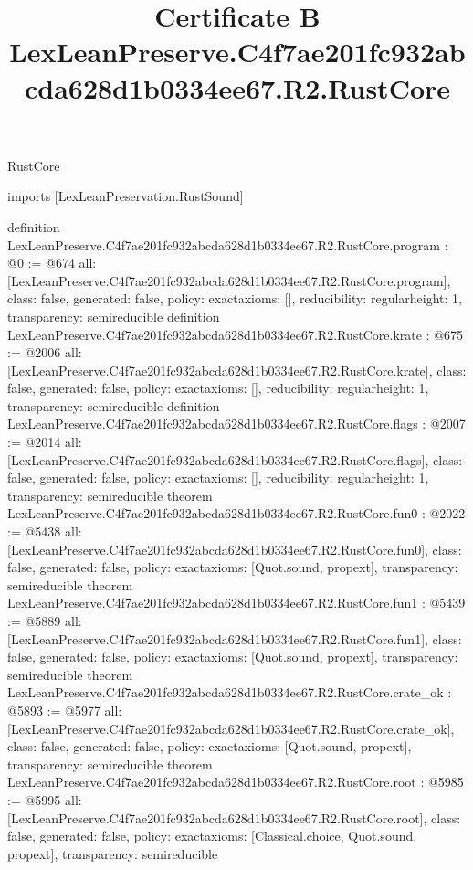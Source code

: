 \begin{lexlean}{RustCore}
\title{Certificate B LexLeanPreserve.C4f7ae201fc932abcda628d1b0334ee67.R2.RustCore}
\begin{coremodule}
imports [LexLeanPreservation.RustSound]

definition LexLeanPreserve.C4f7ae201fc932abcda628d1b0334ee67.R2.RustCore.program : @0 := @674 {
  all: [LexLeanPreserve.C4f7ae201fc932abcda628d1b0334ee67.R2.RustCore.program],
  class: false,
  generated: false,
  policy: exact{axioms: []},
  reducibility: regular{height: 1},
  transparency: semireducible
}
definition LexLeanPreserve.C4f7ae201fc932abcda628d1b0334ee67.R2.RustCore.krate : @675 := @2006 {
  all: [LexLeanPreserve.C4f7ae201fc932abcda628d1b0334ee67.R2.RustCore.krate],
  class: false,
  generated: false,
  policy: exact{axioms: []},
  reducibility: regular{height: 1},
  transparency: semireducible
}
definition LexLeanPreserve.C4f7ae201fc932abcda628d1b0334ee67.R2.RustCore.flags : @2007 := @2014 {
  all: [LexLeanPreserve.C4f7ae201fc932abcda628d1b0334ee67.R2.RustCore.flags],
  class: false,
  generated: false,
  policy: exact{axioms: []},
  reducibility: regular{height: 1},
  transparency: semireducible
}
theorem LexLeanPreserve.C4f7ae201fc932abcda628d1b0334ee67.R2.RustCore.fun0 : @2022 := @5438 {
  all: [LexLeanPreserve.C4f7ae201fc932abcda628d1b0334ee67.R2.RustCore.fun0],
  class: false,
  generated: false,
  policy: exact{axioms: [Quot.sound, propext]},
  transparency: semireducible
}
theorem LexLeanPreserve.C4f7ae201fc932abcda628d1b0334ee67.R2.RustCore.fun1 : @5439 := @5889 {
  all: [LexLeanPreserve.C4f7ae201fc932abcda628d1b0334ee67.R2.RustCore.fun1],
  class: false,
  generated: false,
  policy: exact{axioms: [Quot.sound, propext]},
  transparency: semireducible
}
theorem LexLeanPreserve.C4f7ae201fc932abcda628d1b0334ee67.R2.RustCore.crate_ok : @5893 := @5977 {
  all: [LexLeanPreserve.C4f7ae201fc932abcda628d1b0334ee67.R2.RustCore.crate_ok],
  class: false,
  generated: false,
  policy: exact{axioms: [Quot.sound, propext]},
  transparency: semireducible
}
theorem LexLeanPreserve.C4f7ae201fc932abcda628d1b0334ee67.R2.RustCore.root : @5985 := @5995 {
  all: [LexLeanPreserve.C4f7ae201fc932abcda628d1b0334ee67.R2.RustCore.root],
  class: false,
  generated: false,
  policy: exact{axioms: [Classical.choice, Quot.sound, propext]},
  transparency: semireducible
}


\end{coremodule}
\end{lexlean}
